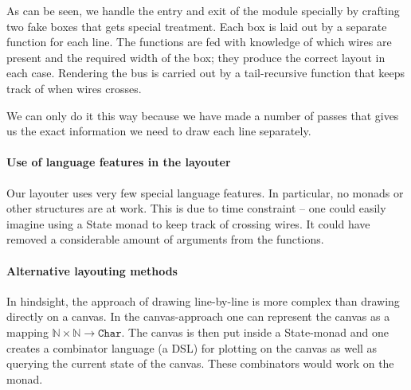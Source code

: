 As can be seen, we handle the entry and exit of the module specially
by crafting two fake boxes that gets special treatment. Each box is
laid out by a separate function for each line. The functions are fed
with knowledge of which wires are present and the required width of
the box; they produce the correct layout in each case. Rendering the
bus is carried out by a tail-recursive function that keeps track of
when wires crosses.

We can only do it this way because we have made a number of passes
that gives us the exact information we need to draw each line
separately.

\paragraph{Use of language features in the layouter}
\label{sec:use-lang-feat}

Our layouter uses very few special language features. In particular,
no monads or other structures are at work. This is due to time
constraint -- one could easily imagine using a State monad to keep
track of crossing wires. It could have removed a considerable amount
of arguments from the functions.

\paragraph{Alternative layouting methods}
\label{sec:altern-layo-meth}

In hindsight, the approach of drawing line-by-line is more complex than
drawing directly on a canvas. In the canvas-approach one can represent
the canvas as a mapping $\mathbb{N} \times \mathbb{N} \to
\texttt{Char}$. The canvas is then put inside a State-monad and one
creates a combinator language (a DSL) for plotting on the canvas as
well as querying the current state of the canvas. These combinators
would work on the monad.

